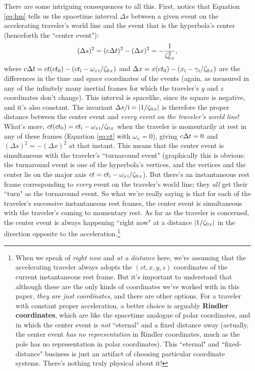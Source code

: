 \documentclass[12pt]{article}
\begin{document}
There are some intriguing consequences to all this. First, notice that Equation \ref{eq:hm} tells us the spacetime interval $\Delta s$ between a given event on the accelerating traveler's world line and the event that is the hyperbola's center (henceforth the ``center event"):
\begin{equation*}
(\Delta s)^2 = (c \mkern.5mu \Delta t)^2 - (\Delta x)^2 = - \dfrac{1}{ \zeta^2_{0 \mkern2mu x}},
\end{equation*}
where $c \mkern.5mu \Delta t = ct(ct_0) - (ct_{\mathrm{i}} - \omega_{x \mkern2mu \textrm{i} } / \zeta_{0 \mkern2mu x})$ and $\Delta x = x(ct_0) - (x_{\mathrm{i}} - \gamma_{\mkern1mu \mathrm{i}} / \zeta_{0 \mkern2mu x})$ are the differences in the time and space coordinates of the events (again, as measured in any of the infinitely many inertial frames for which the traveler's $y$ and $z$ coordinates don't change). This interval is spacelike, since its square is negative, and it's also constant. The invariant $\Delta s / \mathrm{i} = |1 / \zeta_{0 \mkern2mu x}|$ is therefore the proper distance between the center event and \emph{every event on the traveler's world line}! What's more, $ct(ct_0) = ct_{\mathrm{i}} - \omega_{x \mkern2mu \textrm{i} } / \zeta_{0 \mkern2mu x}$ when the traveler is momentarily at rest in any of these frames (Equation \ref{eq:ct} with $\omega_x = 0$), giving $c \mkern.5mu \Delta t = 0$ and $(\Delta s)^2 = - (\Delta x)^2$ at that instant. This means that the center event is simultaneous with the traveler's ``turnaround event" (graphically this is obvious: the turnaround event is one of the hyperbola's vertices, and the vertices and the center lie on the major axis $ct = ct_{\mathrm{i}} - \omega_{x \mkern2mu \textrm{i} } / \zeta_{0 \mkern2mu x}$). But there's an instantaneous rest frame corresponding to \emph{every} event on the traveler's world line; they \emph{all} get their ``turn" as the turnaround event. So what we're really saying is that for each of the traveler's successive instantaneous rest frames, the center event is simultaneous with the traveler's coming to momentary rest. As far as the traveler is concerned, the center event is always happening ``right now" at a distance $|1 / \zeta_{0 \mkern2mu x}|$ in the direction opposite to the acceleration.\footnote{When we speak of \emph{right now} and \emph{at a distance} here, we're assuming that the accelerating traveler always adopts the $(ct, x, y, z)$ coordinates of the current instantaneous rest frame. But it's important to understand that although these are the only kinds of coordinates we've worked with in this paper, \emph{they are just coordinates}, and there are other options. For a traveler with constant proper acceleration, a better choice is arguably \textbf{Rindler coordinates}, which are like the spacetime analogue of polar coordinates, and in which the center event is \emph{not} ``eternal" and a fixed distance away (actually, the center event \emph{has no representation} in Rindler coordinates, much as the pole has no representation in polar coordinates). This ``eternal" and ``fixed-distance" business is just an artifact of choosing particular coordinate systems. There's nothing truly physical about it!}
\end{document}
